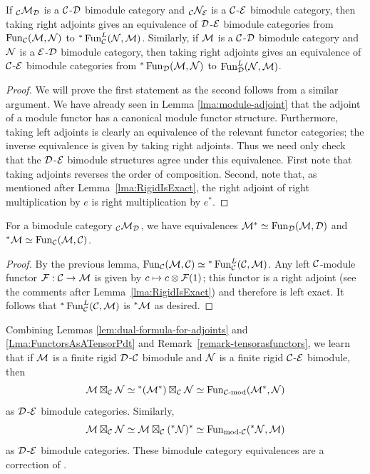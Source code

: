 \documentclass{amsart}
\begin{document}
\begin{lemma}
If ${}_{\mathcal C}\mathcal M_\mathcal D$ is a $\mathcal C$-$\mathcal D$ bimodule category and ${}_{\mathcal C}\mathcal N_\mathcal E$ is a $\mathcal C$-$\mathcal E$ bimodule category, then taking right adjoints gives an equivalence of $\mathcal D$-$\mathcal E$ bimodule categories 
from $\operatorname{Fun}_{\mathcal C}(\mathcal M, \mathcal N)$ to ${}^*\operatorname{Fun}^L_{\mathcal C}(\mathcal N, \mathcal M)$.
Similarly, if $\mathcal M$ is a $\mathcal C$-$\mathcal D$ bimodule category and $\mathcal N$ is a $\mathcal E$-$\mathcal D$ bimodule category, then taking right adjoints gives an equivalence of $\mathcal C$-$\mathcal E$ bimodule categories from ${}^*\operatorname{Fun}_{\mathcal D}(\mathcal M, \mathcal N)$ to $\operatorname{Fun}^L_{\mathcal D}(\mathcal N, \mathcal M)$. 
\end{lemma}
\begin{proof}
	We will prove the first statement as the second follows from a similar argument. 
We have already seen in Lemma \ref{lma:module-adjoint} that the adjoint of a module functor has a canonical module functor structure.  Furthermore, taking left adjoints is clearly an equivalence of the relevant functor categories; the inverse equivalence is given by taking right adjoints. Thus we need only check that the $\mathcal D$-$\mathcal E$ bimodule structures agree under this equivalence.  First note that taking adjoints reverses the order of composition. Second, note that, as mentioned after Lemma~\ref{lma:RigidIsExact}, the right adjoint of right multiplication by $e$ is right multiplication by $e^*$.
\end{proof}

\begin{lemma} \label{lem:dual-formula-for-adjoints}
For a bimodule category ${}_\mathcal C \mathcal M_\mathcal D$, we have equivalences $\mathcal M^* \simeq \operatorname{Fun}_{\mathcal D}(\mathcal M, \mathcal D)$ and ${}^*\mathcal M \simeq \operatorname{Fun}_{\mathcal C}(\mathcal M, \mathcal C)$.
\end{lemma}
\begin{proof}
By the previous lemma, $\operatorname{Fun}_{\mathcal C}(\mathcal M, \mathcal C) \simeq {}^*\operatorname{Fun}_{\mathcal C}^L(\mathcal C, \mathcal M)$.  Any left $\mathcal C$-module functor $\mathcal F: \mathcal C \rightarrow \mathcal M$ is given by $c \mapsto c \otimes \mathcal F(1)$; this functor is a right adjoint (see the comments after Lemma~\ref{lma:RigidIsExact}) and therefore is left exact.  It follows that ${}^*\operatorname{Fun}_{\mathcal C}^L(\mathcal C, \mathcal M)$ is ${}^* \mathcal M$ as desired.
\end{proof}

\begin{remark}
Combining Lemmas \ref{lem:dual-formula-for-adjoints} and \ref{Lma:FunctorsAsATensorPdt} and Remark~\ref{remark-tensorasfunctors}, we learn that if $\mathcal M$ is a finite rigid $\mathcal D$-$\mathcal C$ bimodule and $\mathcal N$ is a finite rigid $\mathcal C$-$\mathcal E$ bimodule, then 
\begin{equation*}
	\mathcal M \boxtimes_\mathcal C \mathcal N \simeq {}^*(\mathcal M^*) \boxtimes_\mathcal C \mathcal N \simeq \operatorname{Fun}_{\mathcal C\text{-mod}}(\mathcal M^*,\mathcal N)
\end{equation*}
as $\mathcal D$-$\mathcal E$ bimodule categories.   Similarly, 
\begin{equation*}
	\mathcal M \boxtimes_{\mathcal C} \mathcal N \simeq \mathcal M \boxtimes_\mathcal C ({}^*\mathcal N)^* \simeq \operatorname{Fun}_{\text{mod-}\mathcal C}({}^*\mathcal N,\mathcal M)
\end{equation*}
as $\mathcal D$-$\mathcal E$ bimodule categories.  These bimodule category equivalences are a correction of \cite[Remark 3.6]{0909.3140}.
\end{remark}
\end{document}
